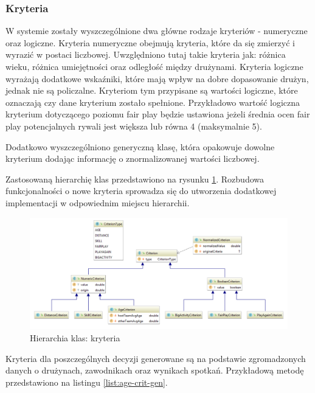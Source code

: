 \subsubsection{Kryteria}

W systemie zostały wyszczególnione dwa główne rodzaje kryteriów - numeryczne oraz logiczne. Kryteria numeryczne obejmują kryteria, które da się zmierzyć i wyrazić w postaci liczbowej. Uwzględniono tutaj takie kryteria jak: różnica wieku, różnica umiejętności oraz odległość między drużynami. Kryteria logiczne wyrażają dodatkowe wskaźniki, które mają wpływ na dobre dopasowanie drużyn, jednak nie są policzalne.  Kryteriom tym przypisane są wartości logiczne, które oznaczają czy dane kryterium zostało spełnione. Przykładowo wartość logiczna kryterium dotyczącego poziomu fair play będzie ustawiona jeżeli średnia ocen fair play potencjalnych rywali jest większa lub równa 4 (maksymalnie 5).

Dodatkowo wyszczególniono generyczną klasę, która opakowuje dowolne kryterium dodając informację o znormalizowanej wartości liczbowej. 

Zastosowaną hierarchię klas przedstawiono na rysunku \ref{fig:criterion-classes}. Rozbudowa funkcjonalności o nowe kryteria sprowadza się do utworzenia dodatkowej implementacji w odpowiednim miejscu hierarchii.  

\begin{figure}[H]
\centering
\includegraphics[width=\linewidth]{06-implementacja/rys/criterion-package-classes.PNG}
\caption{Hierarchia klas: kryteria}
\label{fig:criterion-classes}
\end{figure}

Kryteria dla poszczególnych decyzji generowane są na podstawie zgromadzonych danych o drużynach, zawodnikach oraz wynikach spotkań. Przykładową metodę przedstawiono na listingu \ref{list:age-crit-gen}. 


